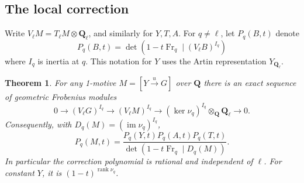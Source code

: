\documentclass[11pt]{amsart}
\numberwithin{equation}{section}
\newtheorem{theorem}{Theorem}[section]
\theoremstyle{definition}
\theoremstyle{remark}
\newcommand{\Q}{\mathbf Q}
\newcommand{\Fr}{\operatorname{Fr}}
\newcommand{\im}{\operatorname{im}}
\newcommand{\rank}{\operatorname{rank}}
\begin{document}
\subsection{The local correction}

Write $V_\ell M=T_\ell M\otimes\Q_\ell$, and similarly for
$Y,T,A$. For $q\ne\ell$, let $P_q(B,t)$ denote
\[
 P_q(B,t)=\det(1-t\Fr_q\mid(V_\ell B)^{I_q})
\]
where $I_q$ is inertia at $q$. This notation for $Y$ uses
the Artin representation $Y_{\Q_\ell}$.

\begin{theorem}\label{thm:euler}
For any 1-motive $M=[Y\xrightarrow{u}G]$ over $\Q$ there is an exact
sequence of geometric Frobenius modules
\begin{equation}\label{eq:euler-seq}
 0\longrightarrow (V_\ell G)^{I_q}
 \longrightarrow (V_\ell M)^{I_q}
 \longrightarrow (\ker\nu_q)^{I_q}\otimes_\Q\Q_\ell
 \longrightarrow0 .
\end{equation}
Consequently, with $D_q(M)=(\im\nu_q)^{I_q}$,
\begin{equation}\label{eq:localeuler}
 P_q(M,t)
 =
 \frac{P_q(Y,t)P_q(A,t)P_q(T,t)}
 {\det(1-t\Fr_q\mid D_q(M))}.
\end{equation}
In particular the correction polynomial is rational and independent
of $\ell$. For constant $Y$, it is $(1-t)^{\rank\nu_q}$.
\end{theorem}
\end{document}
